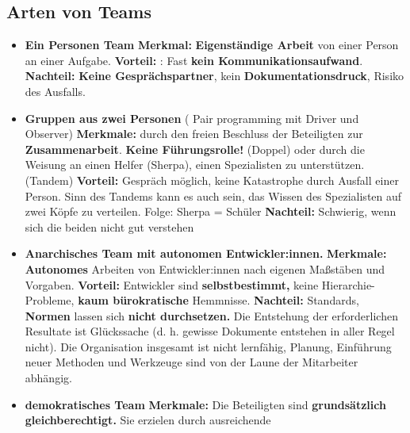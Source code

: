 \documentclass{book}
\begin{document}
    \subsection{\textbf{Arten von Teams}}
    \begin{itemize}
        \item \textbf{Ein Personen Team}
        \newline \textbf{Merkmal: } \textbf{Eigenständige Arbeit} von einer Person an einer Aufgabe.
        \newline \textbf{Vorteil: } : Fast \textbf{kein Kommunikationsaufwand}.
        \newline \textbf{Nachteil: }\textbf{Keine Gesprächspartner}, kein \textbf{Dokumentationsdruck}, Risiko des Ausfalls.
        \item \textbf{Gruppen aus zwei Personen} ( Pair programming mit Driver und Observer)
        \newline  \textbf{Merkmale: } durch den freien Beschluss der Beteiligten zur \textbf{Zusammenarbeit}. \textbf{Keine Führungsrolle!} (Doppel) oder  durch die Weisung an einen Helfer (Sherpa), einen Spezialisten zu unterstützen. (Tandem)
        \newline \textbf{Vorteil: }Gespräch möglich, keine Katastrophe durch Ausfall einer Person. Sinn des Tandems
        kann es auch sein, das Wissen des Spezialisten auf zwei Köpfe zu verteilen. Folge: Sherpa = Schüler
        \newline \textbf{Nachteil: }Schwierig, wenn sich die beiden nicht gut verstehen
        \item \textbf{Anarchisches Team mit autonomen Entwickler:innen.}
        \newline \textbf{Merkmale: }\textbf{ Autonomes} Arbeiten von Entwickler:innen nach eigenen Maßstäben und Vorgaben.
        \newline \textbf{Vorteil: } Entwickler sind \textbf{selbstbestimmt, }keine Hierarchie-Probleme,\textbf{ kaum bürokratische }Hemmnisse.
        \newline \textbf{Nachteil: } Standards, \textbf{Normen }lassen sich\textbf{ nicht durchsetzen.} Die Entstehung der erforderlichen Resultate
        ist Glückssache (d. h. gewisse Dokumente entstehen in aller Regel nicht). Die Organisation insgesamt ist
        nicht lernfähig, Planung, Einführung neuer Methoden und Werkzeuge sind von der Laune der Mitarbeiter
        abhängig.
        \item \textbf{demokratisches Team }
        \newline \textbf{Merkmale: }Die Beteiligten sind \textbf{grundsätzlich gleichberechtigt.} Sie erzielen durch ausreichende

\end{itemize}
\end{document}
